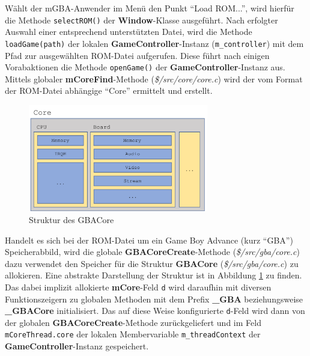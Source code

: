 \documentclass[11pt,a4paper]{scrartcl}
\begin{document}
W\"ahlt der mGBA-Anwender im Men\"u den Punkt \enquote{Load ROM...}, wird hierf\"ur die Methode \verb|selectROM()| der \textbf{Window}-Klasse ausgef\"uhrt. Nach erfolgter Auswahl einer entsprechend unterst\"utzten Datei, wird die Methode \verb|loadGame(path)|  der lokalen \textbf{GameController}-Instanz (\verb|m_controller|) mit dem Pfad zur ausgew\"ahlten ROM-Datei aufgerufen. Diese f\"uhrt nach einigen Vorabaktionen die Methode \verb|openGame()| der \textbf{GameController}-Instanz aus. Mittels globaler \textbf{mCoreFind}-Methode (\textit{\$/src/core/core.c}) wird der vom Format der ROM-Datei abh\"angige \enquote{Core} ermittelt und erstellt.

\begin{figure}[h]
    \centering
    \includegraphics[width=0.7\textwidth]{Emulator_Core}
    \caption{Struktur des GBACore}
    \label{fig:mcore}
\end{figure}

Handelt es sich bei der ROM-Datei um ein Game Boy Advance (kurz \enquote{GBA}) Speicherabbild, wird die globale \textbf{GBACoreCreate}-Methode (\textit{\$/src/gba/core.c}) dazu verwendet den Speicher f\"ur die Struktur \textbf{GBACore} (\textit{\$/src/gba/core.c}) zu allokieren. Eine abstrakte Darstellung der Struktur ist in Abbildung \ref{fig:mcore} zu finden. Das dabei implizit allokierte \textbf{mCore}-Feld \verb|d| wird daraufhin mit diversen Funktionszeigern zu globalen Methoden mit dem Prefix \textbf{{\_}GBA} beziehungsweise \textbf{{\_}GBACore} initialisiert. Das auf diese Weise konfigurierte \verb|d|-Feld wird dann von der globalen \textbf{GBACoreCreate}-Methode zur\"uckgeliefert und im Feld \verb|mCoreThread.core| der lokalen Membervariable \verb|m_threadContext| der \textbf{GameController}-Instanz gespeichert.
\end{document}
